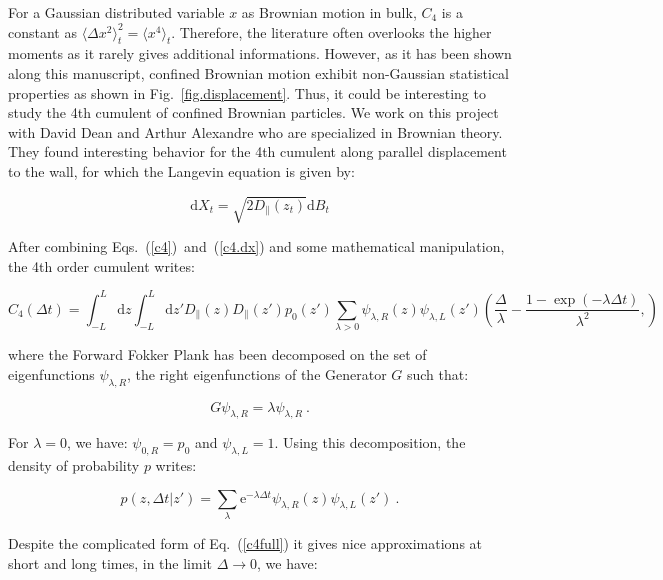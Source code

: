 For a Gaussian distributed variable $x$ as Brownian motion in bulk, $C_4$ is a constant as $\langle \Delta x ^2 \rangle _t ^2 = \langle x^4 \rangle_t $. Therefore, the literature often overlooks the higher moments as it rarely gives additional informations. However, as it has been shown along this manuscript, confined Brownian motion exhibit non-Gaussian statistical properties as shown in Fig.~\ref{fig.displacement}. Thus, it could be interesting to study the 4th cumulent of confined Brownian particles. We work on this project with David Dean and Arthur Alexandre who are specialized in Brownian theory. They found interesting behavior for the 4th cumulent along parallel displacement to the wall, for which the Langevin equation is given by:

\begin{equation}
	\mathrm{d}X_t = \sqrt{2D_\parallel(z_t)} \mathrm{d}B_t
	\label{c4.dx}
\end{equation}

After combining Eqs.~(\ref{c4})~and~(\ref{c4.dx}) and some mathematical manipulation, the 4th order cumulent writes:

\begin{equation}
	C_4(\Delta t) = \int_{-L} ^L \mathrm{d}z 
	\int ^L _{-L}\mathrm{d}z'
	D_\parallel(z) D_\parallel(z') p_0(z') 
	\sum_{\lambda > 0} \psi_{\lambda, R} (z) \psi_{\lambda, L}(z')
	\left(
	\frac{\Delta}{\lambda} - \frac{1 - \exp(-\lambda \Delta t)}{\lambda ^2},
	\right) 
	\label{c4full}
\end{equation}

where the Forward Fokker Plank has been decomposed on the set of eigenfunctions $\psi_{\lambda, R}$, the right eigenfunctions of the Generator $G$ such that:

\begin{equation}
	G\psi_{\lambda, R} = \lambda \psi_{\lambda, R} ~.
\end{equation}

For $\lambda = 0$, we have: $\psi_{0, R} = p_0$ and $\psi_{\lambda, L} = 1$. Using this decomposition, the density of probability $p$ writes:

\begin{equation}
	p(z, \Delta t|z') = \sum _\lambda \mathrm{e} ^{-\lambda \Delta t} \psi_{\lambda, R} (z) \psi_{\lambda, L} (z') ~.
\end{equation}

Despite the complicated form of Eq.~(\ref{c4full}) it gives nice approximations at short and long times, in the limit $\Delta \rightarrow 0$, we have:

